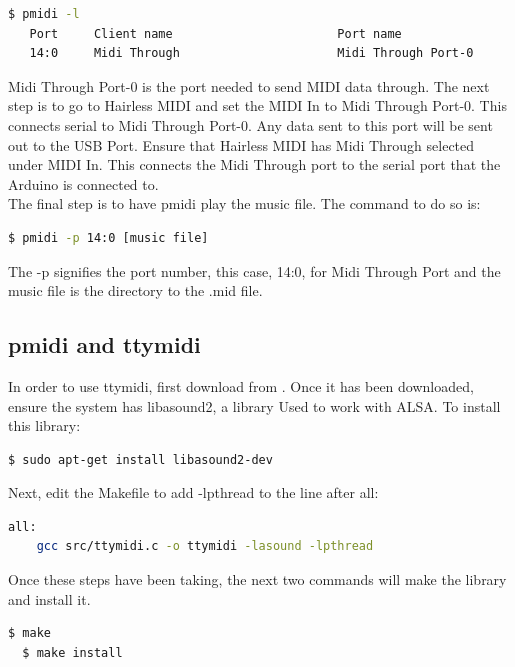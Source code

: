 \documentclass[11pt, a4paper]{report}
\begin{document}
\begin{lstlisting}[language=bash]
  $ pmidi -l
   Port     Client name                       Port name
   14:0     Midi Through                      Midi Through Port-0
\end{lstlisting}

Midi Through Port-0 is the port needed to send MIDI data through. The next step is to go to Hairless MIDI and set the MIDI In to Midi Through Port-0. This connects serial to Midi Through Port-0. Any data sent to this port will be sent out to the USB Port. Ensure that Hairless MIDI has Midi Through selected under MIDI In. This connects the Midi Through port to the serial port that the Arduino is connected to. \\

The final step is to have pmidi play the music file. The command to do so is:
 
\begin{lstlisting}[language=bash]
  $ pmidi -p 14:0 [music file]
\end{lstlisting}

The -p signifies the port number, this case, 14:0, for Midi Through Port and the music file is the directory to the .mid file. \\


\subsection{pmidi and ttymidi}\label{ttymidiSECTION}

In order to use ttymidi, first download from \cite{ttymidi}. Once it has been downloaded, ensure the system has libasound2, a library Used to work with ALSA. To install this library:

\begin{lstlisting}[language=bash]
  $ sudo apt-get install libasound2-dev
\end{lstlisting}

Next, edit the Makefile to add -lpthread to the line after all:

\begin{lstlisting}[language=bash]
all:
    gcc src/ttymidi.c -o ttymidi -lasound -lpthread
\end{lstlisting}

Once these steps have been taking, the next two commands will make the library and install it. 

\begin{lstlisting}[language=bash]
  $ make
  $ make install
\end{lstlisting}
\end{document}
